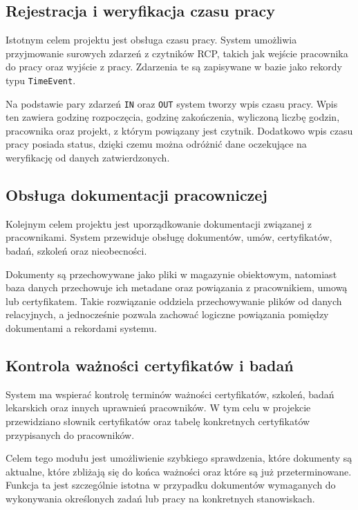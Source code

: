 \subsection{Rejestracja i weryfikacja czasu pracy}

Istotnym celem projektu jest obsługa czasu pracy. System umożliwia przyjmowanie surowych zdarzeń z czytników RCP, takich jak wejście pracownika do pracy oraz wyjście z pracy. Zdarzenia te są zapisywane w bazie jako rekordy typu \texttt{TimeEvent}.

Na podstawie pary zdarzeń \texttt{IN} oraz \texttt{OUT} system tworzy wpis czasu pracy. Wpis ten zawiera godzinę rozpoczęcia, godzinę zakończenia, wyliczoną liczbę godzin, pracownika oraz projekt, z którym powiązany jest czytnik. Dodatkowo wpis czasu pracy posiada status, dzięki czemu można odróżnić dane oczekujące na weryfikację od danych zatwierdzonych.

\subsection{Obsługa dokumentacji pracowniczej}

Kolejnym celem projektu jest uporządkowanie dokumentacji związanej z pracownikami. System przewiduje obsługę dokumentów, umów, certyfikatów, badań, szkoleń oraz nieobecności.

Dokumenty są przechowywane jako pliki w magazynie obiektowym, natomiast baza danych przechowuje ich metadane oraz powiązania z pracownikiem, umową lub certyfikatem. Takie rozwiązanie oddziela przechowywanie plików od danych relacyjnych, a jednocześnie pozwala zachować logiczne powiązania pomiędzy dokumentami a rekordami systemu.

\subsection{Kontrola ważności certyfikatów i badań}

System ma wspierać kontrolę terminów ważności certyfikatów, szkoleń, badań lekarskich oraz innych uprawnień pracowników. W tym celu w projekcie przewidziano słownik certyfikatów oraz tabelę konkretnych certyfikatów przypisanych do pracowników.

Celem tego modułu jest umożliwienie szybkiego sprawdzenia, które dokumenty są aktualne, które zbliżają się do końca ważności oraz które są już przeterminowane. Funkcja ta jest szczególnie istotna w przypadku dokumentów wymaganych do wykonywania określonych zadań lub pracy na konkretnych stanowiskach.

